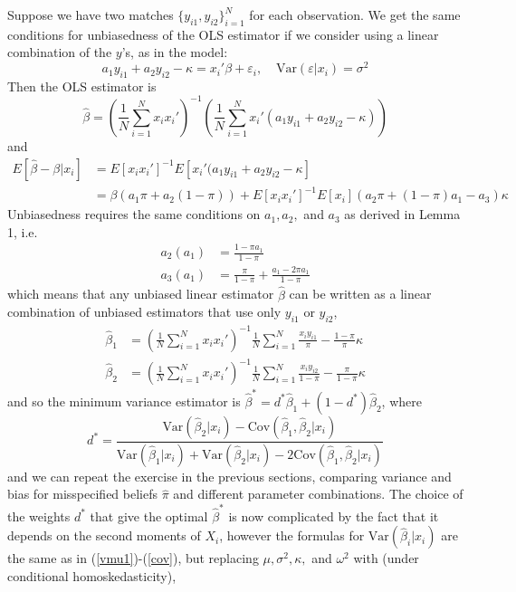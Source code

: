 \documentclass[12pt]{article}
\newcommand{\Var}[1]{\text{Var}\left(#1\right)}
\begin{document}
Suppose we have two matches $\{y_{i1}, y_{i2}\}_{i=1}^N$ for each observation.  We get the same conditions for unbiasedness of the OLS estimator if we consider using a linear combination of the $y$'s, as in the model:
\begin{equation} a_1 y_{i1} + a_2 y_{i2} - \kappa = x_i'\beta + \varepsilon_i, \ \hspace{10pt} \Var{\varepsilon | x_i } = \sigma^2  \end{equation}
Then the OLS estimator is
$$ \hat{\beta} = \left(\frac{1}{N}\sum_{i=1}^N x_i x_i'\right)^{-1} \left(\frac{1}{N}\sum_{i=1}^N x_i'(a_1 y_{i1} + a_2 y_{i2} - \kappa)\right) $$
and
\begin{align*}
E\left[\hat{\beta} - \beta \Big| x_i \right] &= E[x_ix_i']^{-1} E[x_i'(a_1 y_{i1} + a_2 y_{i2} - \kappa] \\
&= \beta(a_1 \pi + a_2 (1-\pi)) + E[x_ix_i']^{-1}E[x_i](a_2 \pi + (1-\pi)a_1 - a_3) \kappa 
\end{align*}
Unbiasedness requires the same conditions on $a_1, a_2,$ and $a_3$ as derived in Lemma 1, i.e.
\begin{align*}
a_2(a_1) &=  \frac{1-\pi a_1}{1-\pi} \\ a_3(a_1) &= \frac{\pi}{1-\pi} + \frac{a_1 - 2\pi a_1}{1-\pi} 
\end{align*}
which means that any unbiased linear estimator $\hat{\beta}$ can be written as a linear combination of unbiased estimators that use only $y_{i1}$ or $y_{i2}$,
\begin{align*}
\hat{\beta}_{1} &= \left(\frac{1}{N}\sum_{i=1}^N x_i x_i'\right)^{-1}\frac{1}{N}\sum_{i=1}^N \frac{x_i y_{i1}}{\pi} - \frac{1-\pi}{\pi}\kappa \\
 \hat{\beta}_{2} &= \left(\frac{1}{N}\sum_{i=1}^N x_i x_i'\right)^{-1}\frac{1}{N}\sum_{i=1}^N \frac{x_i y_{i2}}{1-\pi} - \frac{\pi}{1-\pi}\kappa 
 \end{align*}
 and so the minimum variance estimator is $\hat{\beta}^* = d^* \hat{\beta}_1 + (1-d^*)\hat{\beta}_2$, where 
 \begin{equation}
 d^* = \frac{\Var{\hat{\beta}_{2} \Big| x_i} - \text{Cov}\left(\hat{\beta}_1, \hat{\beta}_2 \Big| x_i \right)}{\Var{\hat{\beta}_1\Big| x_i} + \Var{\hat{\beta}_{2}\Big| x_i} - 2 \text{Cov}\left(\hat{\beta}_1, \hat{\beta}_2 \Big| x_i \right)}
 \end{equation}
and we can repeat the exercise in the previous sections, comparing variance and bias for misspecified beliefs $\hat{\pi}$ and different parameter combinations.  The choice of the weights $d^*$ that give the optimal $\hat{\beta}^*$ is now complicated by the fact that it depends on the second moments of $X_i$, however the formulas for $\Var{\hat{\beta}_i \Big| x_i }$ are the same as in (\ref{vmu1})-(\ref{cov}), but replacing $\mu, \sigma^2, \kappa,$ and $\omega^2$ with (under conditional homoskedasticity),
\end{document}
